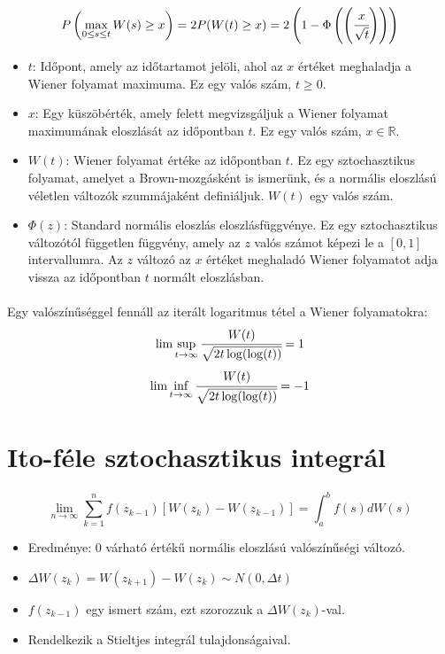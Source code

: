 \documentclass[11pt,a4pape,draftr]{article}
\begin{document}
				\paragraph{}
					$$P\left( \max_{0 \le s \le t} W(s) \ge x\right) = 2P(W(t) \ge x) = 2 \left( 1- \Phi\left(\left( \cfrac{x}{\sqrt{t}} \right)\right) \right) $$
					\begin{itemize}
						\item $t$: Időpont, amely az időtartamot jelöli, ahol az $x$ értéket meghaladja a Wiener folyamat maximuma. Ez egy valós szám, $t \geq 0$.
						\item $x$: Egy küszöbérték, amely felett megvizsgáljuk a Wiener folyamat maximumának eloszlását az időpontban $t$. Ez egy valós szám, $x \in \mathbb{R}$.
						\item $W(t)$: Wiener folyamat értéke az időpontban $t$. Ez egy sztochasztikus folyamat, amelyet a Brown-mozgásként is ismerünk, és a normális eloszlású véletlen változók szummájaként definiáljuk. $W(t)$ egy valós szám.
						\item $\Phi(z)$: Standard normális eloszlás eloszlásfüggvénye. Ez egy sztochasztikus változótól független függvény, amely az $z$ valós számot képezi le a $[0,1]$ intervallumra. Az $z$ változó az $x$ értéket meghaladó Wiener folyamatot adja vissza az időpontban $t$ normált eloszlásban.
					\end{itemize}
				\paragraph{}
					Egy valószínűséggel fennáll az iterált logaritmus tétel a Wiener folyamatokra:
					$$\lim \sup_{t \to \infty} \cfrac{W(t)}{\sqrt{2t \log(\log(t))}} = 1$$
					$$\lim \inf_{t \to \infty} \cfrac{W(t)}{\sqrt{2t \log(\log(t))}} = -1$$
			\section{Ito-féle sztochasztikus integrál}
				\paragraph{}
					$$\lim_{n \to \infty}\sum_{k=1}^{n} f(z_{k-1})[W(z_k)- W(z_{k-1})] = \int_{a}^b f(s) dW(s)$$
					\begin{itemize}
						\item Eredménye: $0$ várható értékű normális eloszlású valószínűségi változó.
						\item $\Delta W(z_k) = W(z_{k+1}) - W(z_k) \sim N(0, \Delta t)$
						\item $f(z_{k-1})$ egy ismert szám, ezt szorozzuk a $\Delta W(z_k)$-val.
						\item Rendelkezik a Stieltjes integrál tulajdonságaival.
					\end{itemize}
\end{document}
